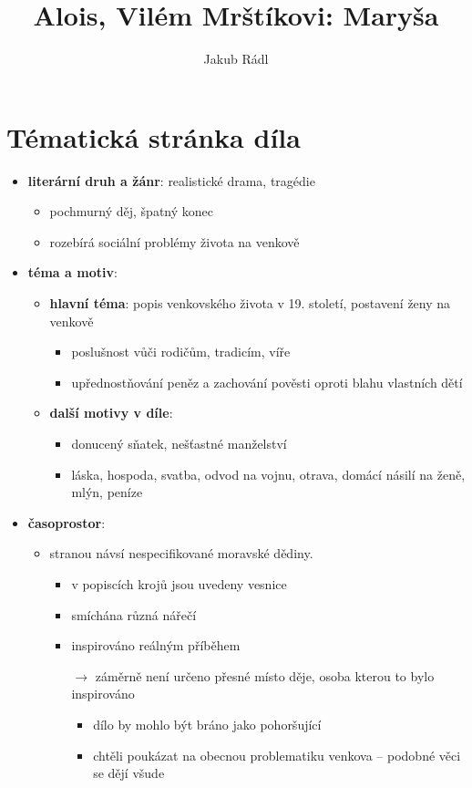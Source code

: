 \documentclass[10pt,a4paper]{article}
\date{}
\author{Jakub Rádl}
\title{Alois, Vilém Mrštíkovi: Maryša}
\newcommand{\ra}{$\rightarrow$ }
\begin{document}
\maketitle

\section*{Tématická stránka díla}
\begin{itemize}
\item \textbf{literární druh a žánr}: realistické drama, tragédie
	\begin{itemize}
	\item pochmurný děj, špatný konec
	\item rozebírá sociální problémy života na venkově
	\end{itemize}
\item \textbf{téma a motiv}: 
	\begin{itemize}
	\item \textbf{hlavní téma}: popis venkovského života v 19. století, postavení ženy na venkově
		\begin{itemize}
		\item poslušnost vůči rodičům, tradicím, víře
		\item upřednostňování peněz a zachování pověsti oproti blahu vlastních dětí
		\end{itemize}
	\item \textbf{další motivy v díle}:
		\begin{itemize}
		\item donucený sňatek, nešťastné manželství
		\item láska, hospoda, svatba, odvod na vojnu, otrava, domácí násilí na ženě, mlýn, peníze
		\end{itemize}
	\end{itemize}
\item \textbf{časoprostor}:
	\begin{itemize}
	\item stranou návsí nespecifikované moravské dědiny.
		\begin{itemize}
		\item v popiscích krojů jsou uvedeny vesnice
		\item smíchána různá nářečí
		\item inspirováno reálným příběhem
		\item[\ra] záměrně není určeno přesné místo děje, osoba kterou to bylo inspirováno
			\begin{itemize}
			\item dílo by mohlo být bráno jako pohoršující
			\item chtěli poukázat na obecnou problematiku venkova -- podobné věci se dějí všude
			\end{itemize}
		

\end{itemize}
\end{itemize}
\end{itemize}
\end{document}
